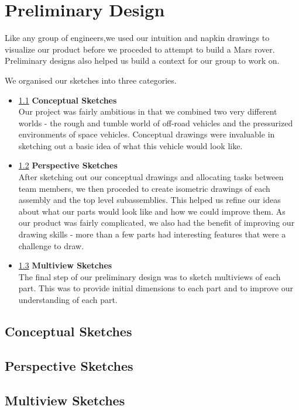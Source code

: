 \chapter{Preliminary Design}
Like any group of engineers,we used our intuition and napkin drawings to visualize our product before we proceded to attempt to build a Mars rover.
Preliminary designs also helped us build a context for our group to work on.

We organised our sketches into three categories.

\begin{itemize}
\item \ref{ConceptualSketch} \textbf{Conceptual Sketches} \\
Our project was fairly ambitious in that we combined two very different worlds - the rough and tumble world of off-road vehicles and the pressurized environments of space vehicles. Conceptual drawings were invaluable in sketching out a basic idea of what this vehicle would look like. 

\item \ref{PerspectiveSketch} \textbf{Perspective Sketches} \\
After sketching out our conceptual drawings and allocating tasks between team members, we then proceded to create isometric drawings of each assembly and the top level subassemblies.
This helped us refine our ideas about what our parts would look like and how we could improve them.
As our product was fairly complicated, we also had the benefit of improving our drawing skills - more than a few parts had interesting features that were a challenge to draw.

\item \ref{MultiviewSketch} \textbf{Multiview Sketches} \\
The final step of our preliminary design was to sketch multiviews of each part. This was to provide initial dimensions to each part and to improve our understanding of each part. 
\end{itemize}

\clearpage
\section{Conceptual Sketches} \label{ConceptualSketch}


\clearpage
 \section{Perspective Sketches}  \label{PerspectiveSketch}
 

\clearpage
 \section{Multiview Sketches}  \label{MultiviewSketch}
 
\clearpage
